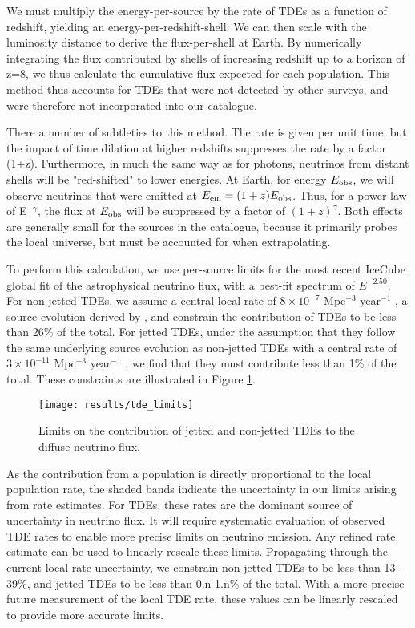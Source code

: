 We must multiply the energy-per-source by the rate of TDEs as a function of redshift, yielding an energy-per-redshift-shell. We can then scale with the luminosity distance to derive the flux-per-shell at Earth. By numerically integrating the flux contributed by shells of increasing redshift up to a horizon of z=8, we thus calculate the cumulative flux expected for each population. This method thus accounts for TDEs that were not detected by other surveys, and were therefore not incorporated into our catalogue. 

There a number of subtleties to this method. The rate is given per unit time, but the impact of time dilation at higher redshifts suppresses the rate by a factor (1+z). Furthermore, in much the same way as for photons, neutrinos from distant shells will be "red-shifted" to lower energies. At Earth, for energy $E_{\textup{obs}}$, we will observe neutrinos that were emitted at $E_{\textup{em}} = (1+z) E_{\textup{obs}}$. Thus, for a power law of E$^{-\gamma}$, the flux at $E_{\textup{obs}}$ will be suppressed by a factor of $(1+z) ^{\gamma}$. Both effects are generally small for the sources in the catalogue, because it primarily probes the local universe, but must be accounted for when extrapolating.

To perform this calculation, we use per-source limits for the most recent IceCube global fit of the astrophysical neutrino flux, with a best-fit spectrum of $E^{-2.50}$. For non-jetted TDEs, we assume a central local rate of $8 \times 10^{-7}$ Mpc$^{-3}$ year$^{-1}$ , a source evolution derived by \cite{Sun:2015bda}, and constrain the contribution of TDEs to be less than 26\% of the total. For jetted TDEs, under the assumption that they follow the same underlying source evolution as non-jetted TDEs with a central rate of $3 \times 10^{-11}$ Mpc$^{-3}$ year$^{-1}$ , we find that they must contribute less than 1\% of the total.  These constraints are illustrated in Figure \ref{fig:DiffuseFlux}.

\begin{figure}[!ht]
	\centering \texttt{[image: results/tde\_limits]}
	\caption{Limits on the contribution of jetted and non-jetted TDEs to the diffuse neutrino flux.}
	\label{fig:DiffuseFlux}
\end{figure}

As the contribution from a population is directly proportional to the local population rate, the shaded bands indicate the uncertainty in our limits arising from rate estimates. For TDEs, these rates are the dominant source of uncertainty in neutrino flux. It will require systematic evaluation of observed TDE rates to enable more precise limits on neutrino emission. Any refined rate estimate can be used to linearly rescale these limits. Propagating through the current local rate uncertainty, we constrain non-jetted TDEs to be less than 13-39\%, and jetted TDEs to be less than 0.n-1.n\% of the total. With a more precise future measurement of the local TDE rate, these values can be linearly rescaled to provide more accurate limits.

